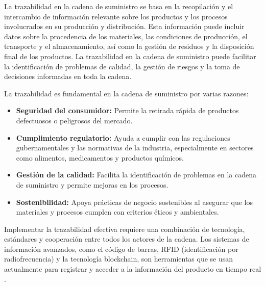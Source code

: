 \documentclass[main.tex]{subfiles}
\begin{document}
La trazabilidad en la cadena de suministro se basa en la recopilación y el intercambio de información relevante sobre los productos y los procesos involucrados en su producción y distribución. Esta información puede incluir datos sobre la procedencia de los materiales, las condiciones de producción, el transporte y el almacenamiento, así como la gestión de residuos y la disposición final de los productos. La trazabilidad en la cadena de suministro puede facilitar la identificación de problemas de calidad, la gestión de riesgos y la toma de decisiones informadas en toda la cadena.

La trazabilidad es fundamental en la cadena de suministro por varias razones:

\begin{itemize}
    \item \textbf{Seguridad del consumidor:} Permite la retirada rápida de productos defectuosos o peligrosos del mercado.
    \item \textbf{Cumplimiento regulatorio:} Ayuda a cumplir con las regulaciones gubernamentales y las normativas de la industria, especialmente en sectores como alimentos, medicamentos y productos químicos.
    \item \textbf{Gestión de la calidad:} Facilita la identificación de problemas en la cadena de suministro y permite mejoras en los procesos.
    \item \textbf{Sostenibilidad:} Apoya prácticas de negocio sostenibles al asegurar que los materiales y procesos cumplen con criterios éticos y ambientales.
\end{itemize}

Implementar la trazabilidad efectiva requiere una combinación de tecnología, estándares y cooperación entre todos los actores de la cadena. Los sistemas de información avanzados, como el código de barras, RFID (identificación por radiofrecuencia) y la tecnología blockchain, son herramientas que se usan actualmente para registrar y acceder a la información del producto en tiempo real \cite{cepeda2010trazabilidad, BISWAS2023128}.
\end{document}
